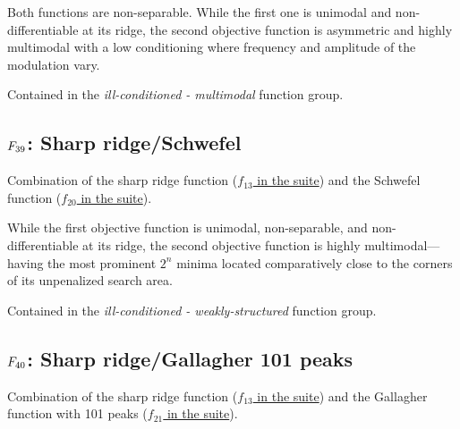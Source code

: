 Both functions are non-separable. While the first one
is unimodal and non-differentiable at its ridge, the second objective
function is asymmetric and highly multimodal with a low conditioning where
frequency and amplitude of the modulation vary.

Contained in the \emph{ill-conditioned - multimodal} function group.



\subsection[\texorpdfstring{\protect\(F_{39}\protect\): Sharp ridge/Schwefel}{F39: Sharp ridge/Schwefel}]{\texorpdfstring{\protect\(F_{39}\protect\): Sharp ridge/Schwefel}{}}
\label{index:f39}\label{index:sharp-ridge-schwefel}
Combination of the sharp ridge function (\href{https://coco.gforge.inria.fr/downloads/download16.00/bbobdocfunctions.pdf\#page=65}{\(f_{13}\) in the \bbob suite}) and the
Schwefel function (\href{https://coco.gforge.inria.fr/downloads/download16.00/bbobdocfunctions.pdf\#page=100}{\(f_{20}\) in the \bbob suite}).

While the first objective function is unimodal, non-separable, and
non-differentiable at its ridge, the second objective function is highly
multimodal---having the most prominent \(2^n\) minima located
comparatively close to the corners of its unpenalized search area.

Contained in the \emph{ill-conditioned - weakly-structured} function group.



\subsection[\texorpdfstring{\protect\(F_{40}\protect\): Sharp ridge/Gallagher 101 peaks}{F40: Sharp ridge/Gallagher 101 peaks}]{\texorpdfstring{\protect\(F_{40}\protect\): Sharp ridge/Gallagher 101 peaks}{}}
\label{index:f40}\label{index:sharp-ridge-gallagher-101-peaks}
Combination of the sharp ridge function (\href{https://coco.gforge.inria.fr/downloads/download16.00/bbobdocfunctions.pdf\#page=65}{\(f_{13}\) in the \bbob suite}) and the
Gallagher function with 101 peaks (\href{https://coco.gforge.inria.fr/downloads/download16.00/bbobdocfunctions.pdf\#page=105}{\(f_{21}\) in the \bbob suite}).

